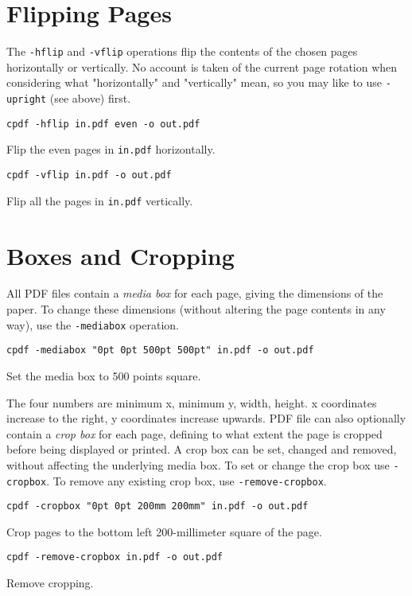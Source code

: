 \documentclass{book}
\begin{document}
  \section{Flipping Pages}
  The \texttt{-hflip} and \texttt{-vflip} operations flip the contents of the
chosen pages horizontally or vertically. No account is taken of the current
page rotation when considering what "horizontally" and "vertically" mean, so you may like to use \texttt{-upright} (see above) first.
  \begin{framed}
    \small\verb!cpdf -hflip in.pdf even -o out.pdf!

    \vspace{2.5mm}
    \noindent Flip the even pages in \texttt{in.pdf} horizontally.

    \vspace{2.5mm}
    \verb!cpdf -vflip in.pdf -o out.pdf!

    \vspace{2.5mm}
    \noindent Flip all the pages in \texttt{in.pdf} vertically.
  \end{framed}

  \section{Boxes and Cropping}
  All PDF files contain a \textit{media box} for each page, giving the
dimensions of the paper. To change these dimensions (without altering the page
contents in any way), use the \texttt{-mediabox} operation.
  \begin{framed}
  \small\verb!cpdf -mediabox "0pt 0pt 500pt 500pt" in.pdf -o out.pdf!

  \vspace{2.5mm}
  \noindent Set the media box to 500 points square.
  \end{framed}
  \noindent The four numbers are minimum x, minimum y, width, height. x
coordinates increase to the right, y coordinates increase upwards.
  PDF file can also optionally contain a \textit{crop box} for each page,
defining to what extent the page is cropped before being displayed or printed.
A crop box can be set, changed and removed, without affecting the underlying
media box. To set or change the crop box use \texttt{-cropbox}. To remove any
existing crop box, use \texttt{-remove-cropbox}.
  \begin{framed}
  \small\verb!cpdf -cropbox "0pt 0pt 200mm 200mm" in.pdf -o out.pdf!

  \vspace{2.5mm}
  \noindent Crop pages to the bottom left 200-millimeter square of the page.

  \vspace{2.5mm}
  \verb!cpdf -remove-cropbox in.pdf -o out.pdf!
  
  \vspace{2.5mm}
  \noindent Remove cropping.
  \end{framed}
\end{document}
